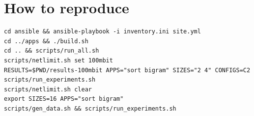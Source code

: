 \documentclass[11pt,a4paper]{article}
\begin{document}
\section{How to reproduce}
\begin{verbatim}
cd ansible && ansible-playbook -i inventory.ini site.yml
cd ../apps && ./build.sh
cd .. && scripts/run_all.sh
scripts/netlimit.sh set 100mbit
RESULTS=$PWD/results-100mbit APPS="sort bigram" SIZES="2 4" CONFIGS=C2 scripts/run_experiments.sh
scripts/netlimit.sh clear
export SIZES=16 APPS="sort bigram"
scripts/gen_data.sh && scripts/run_experiments.sh
\end{verbatim}
\end{document}
